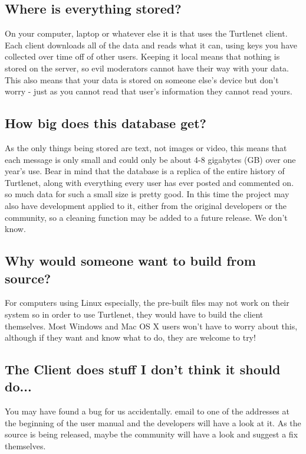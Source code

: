 \subsection{Where is everything stored?}
On your computer, laptop or whatever else it is that uses the Turtlenet client.
Each client downloads all of the data and reads what it can, using keys you have
collected over time off of other users.  Keeping it local means that nothing is
stored on the server, so evil moderators cannot have their way with your data.
This also means that your data is stored on someone else's device but don't worry
 - just as you cannot read that user's information they cannot read yours.

\subsection{How big does this database get?}
As the only things being stored are text, not images or video, this means that
each message is only small and could only be about 4-8 gigabytes (GB) over one
year's use.  Bear in mind that the database is a replica of the entire history
of Turtlenet, along with everything every user has ever posted and commented on.
so much data for such a small size is pretty good.  In this time the project may
also have development applied to it, either from the original developers or the
community, so a cleaning function may be added to a future release.  We don't 
know.

\subsection{Why would someone want to build from source?}
For computers using Linux especially, the pre-built files may not work on their
system so in order to use Turtlenet, they would have to build the client
themselves.  Most Windows and Mac OS X users won't have to worry about this,
although if they want and know what to do, they are welcome to try!

\subsection{The Client does stuff I don't think it should do...}
You may have found a bug for us accidentally.  email to one of the addresses at
the beginning of the user manual and the developers will have a look at it.  As
the source is being released, maybe the community will have a look and suggest a
fix themselves.

